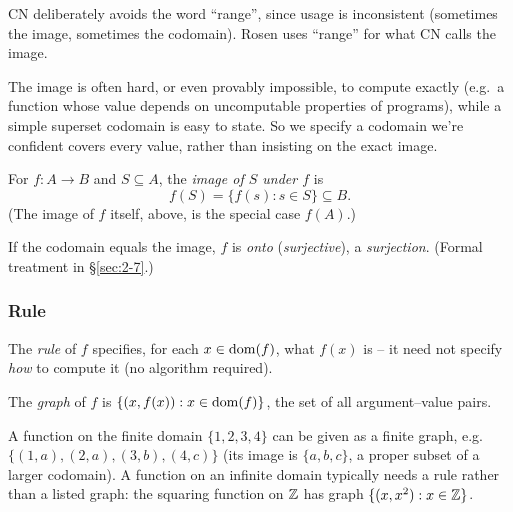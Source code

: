 \documentclass[11pt]{article}
\begin{document}
\begin{note}
CN deliberately avoids the word ``range'', since usage is inconsistent (sometimes the image, sometimes the codomain). Rosen uses ``range'' for what CN calls the image.
\end{note}

\begin{note}
The image is often hard, or even provably impossible, to compute exactly (e.g.\ a function whose value depends on uncomputable properties of programs), while a simple superset codomain is easy to state. So we specify a codomain we're confident covers every value, rather than insisting on the exact image.
\end{note}

\begin{definition}
For $f: A \to B$ and $S \subseteq A$, the \emph{image of $S$ under $f$} is
\[
f(S) = \{f(s) : s \in S\} \subseteq B.
\]
(The image of $f$ itself, above, is the special case $f(A)$.)
\end{definition}

\begin{definition}
If the codomain equals the image, $f$ is \emph{onto} (\emph{surjective}), a \emph{surjection}. (Formal treatment in \S\ref{sec:2-7}.)
\end{definition}

\subsubsection{Rule}
\label{sec:2-1-3}
\begin{definition}[Rule]
The \emph{rule} of $f$ specifies, for each $x \in \operatorname{dom}(f)$, what $f(x)$ is -- it need not specify \emph{how} to compute it (no algorithm required).
\end{definition}

\begin{definition}
The \emph{graph} of $f$ is $\{(x, f(x)) : x \in \operatorname{dom}(f)\}$, the set of all argument--value pairs.
\end{definition}

\begin{example}
A function on the finite domain $\{1,2,3,4\}$ can be given as a finite graph, e.g.\ $\{(1,a),(2,a),(3,b),(4,c)\}$ (its image is $\{a,b,c\}$, a proper subset of a larger codomain). A function on an infinite domain typically needs a rule rather than a listed graph: the squaring function on $\mathbb{Z}$ has graph $\{(x,x^2):x\in\mathbb{Z}\}$.
\end{example}
\end{document}
